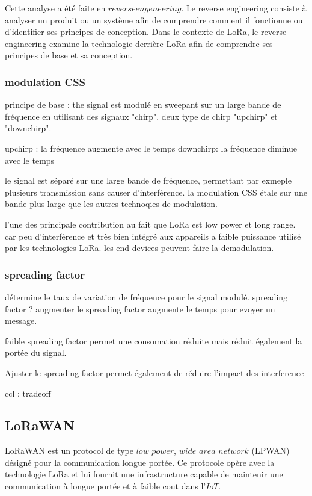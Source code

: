 \documentclass[12pt,a4paper,oneside, titlepage]{report}
\begin{document}
Cette analyse a été faite en $reverse engeneering$. Le reverse engineering consiste à analyser un produit ou un système afin de comprendre comment il fonctionne ou d'identifier ses principes de conception. Dans le contexte de LoRa, le reverse engineering examine la technologie derrière LoRa afin de comprendre ses principes de base et sa conception.

\subsubsection{modulation CSS}

principe de base : the signal est modulé en sweepant sur un large bande de fréquence en utilisant des signaux "chirp". deux type de chirp "upchirp" et "downchirp".

upchirp : la fréquence augmente avec le temps
downchirp: la fréquence diminue avec le temps

le signal est séparé sur une large bande de fréquence, permettant par exmeple plusieurs transmission sans causer d'interférence. la modulation CSS étale sur une bande plus large que les autres technoqies de modulation.

l'une des principale contribution au fait que LoRa est low power et long range. car peu d'interférence et très bien intégré aux appareils a faible puissance utilisé par les technologies LoRa.
les end devices peuvent faire la demodulation.

\subsubsection{spreading factor}

détermine le taux de variation de fréquence pour le signal modulé.
spreading factor ? augmenter le spreading factor augmente le temps pour evoyer un message.

faible spreading factor permet une consomation réduite mais réduit également la portée du signal.

Ajuster le spreading factor permet également de réduire l'impact des interference

ccl : tradeoff





\subsection{LoRaWAN}

LoRaWAN est un protocol de type $low$ $power$, $wide$ $area$ $network$ (LPWAN) désigné pour la communication longue portée. Ce protocole opère avec la technologie LoRa et lui fournit une infrastructure capable de maintenir une communication à longue portée et à faible cout dans l'$IoT$.
\end{document}
